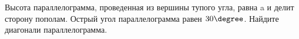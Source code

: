 \begin{ex}
	\begin{condition}
		Высота параллелограмма, проведенная из вершины тупого угла, равна a и делит сторону пополам. Острый угол параллелограмма равен \( 30\degree \). Найдите диагонали параллелограмма.
	\end{condition}
\end{ex}